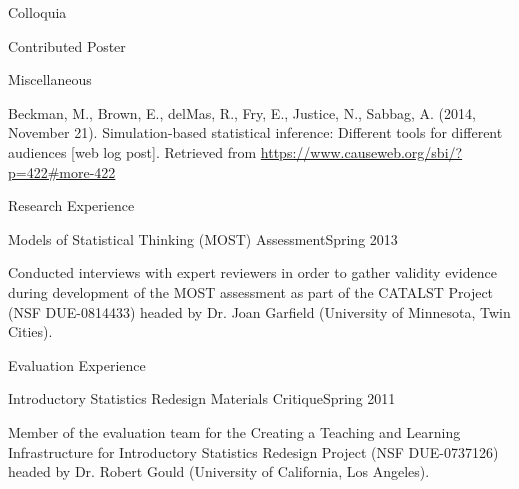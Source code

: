 \documentclass{resume} %
\begin{document}
\begin{rSection}{Colloquia}
\begin{rSubsection}{Contributed Poster}{}{}{}
	\end{rSubsection}

	\begin{rSubsection}{Miscellaneous}{}{}{}
		
		\item[] Beckman, M., Brown, E., delMas, R., Fry, E., Justice, N., Sabbag, A. (2014, November 21). Simulation-based statistical inference: Different tools for different audiences [web log post]. Retrieved from \url{https://www.causeweb.org/sbi/?p=422#more-422} \vspace{0.5em}
		
		
	\end{rSubsection}
	
	
	
\end{rSection}




\begin{rSection}{Research Experience}
	
	
	\begin{rSubsection}{Models of Statistical Thinking (MOST) Assessment}{Spring 2013}{}{}
		\item[] Conducted interviews with expert reviewers in order to gather validity evidence during development of the MOST assessment as part of the CATALST Project (NSF DUE-0814433) headed by Dr. Joan Garfield (University of Minnesota, Twin Cities).
		
	\end{rSubsection}
	
	
\end{rSection}



\begin{rSection}{Evaluation Experience}
	
	
	\begin{rSubsection}{Introductory Statistics Redesign Materials Critique}{Spring 2011}{}{}
		\item[] Member of the evaluation team for the Creating a Teaching and Learning Infrastructure for Introductory Statistics Redesign Project (NSF DUE-0737126) headed by Dr. Robert Gould (University of California, Los Angeles). 
		
	\end{rSubsection}
	
	
\end{rSection}
\end{document}
